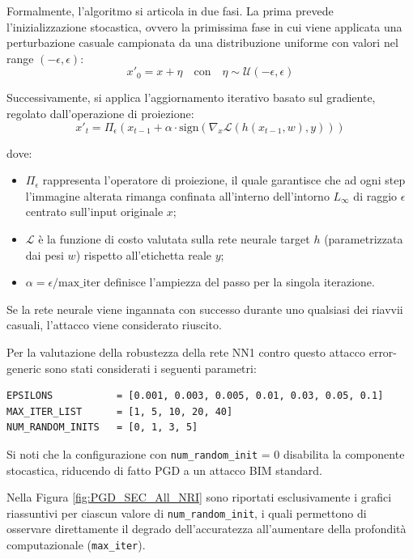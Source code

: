 \documentclass[a4paper, 12pt]{article}
\begin{document}
Formalmente, l'algoritmo si articola in due fasi. La prima prevede l'inizializzazione stocastica, ovvero la primissima fase in cui viene applicata una perturbazione casuale campionata da una distribuzione uniforme con valori nel range $(-\epsilon,\epsilon)$:
$$ x'_0 = x + \eta \quad \text{con} \quad \eta \sim \mathcal{U}(-\epsilon, \epsilon) $$

Successivamente, si applica l'aggiornamento iterativo basato sul gradiente, regolato dall'operazione di proiezione:
$$ x'_t = \Pi_\epsilon \left( x_{t-1} + \alpha \cdot \text{sign}(\nabla_x \mathcal{L}(h(x_{t-1}, w), y)) \right) $$

dove:
\begin{itemize}
    \item $\Pi_\epsilon$ rappresenta l'operatore di proiezione, il quale garantisce che ad ogni step l'immagine alterata rimanga confinata all'interno dell'intorno $L_\infty$ di raggio $\epsilon$ centrato sull'input originale $x$;
    \item $\mathcal{L}$ è la funzione di costo valutata sulla rete neurale target $h$ (parametrizzata dai pesi $w$) rispetto all'etichetta reale $y$;
    \item $\alpha = \epsilon / \text{max\_iter}$ definisce l'ampiezza del passo per la singola iterazione.
\end{itemize}

Se la rete neurale viene ingannata con successo durante uno qualsiasi dei riavvii casuali, l'attacco viene considerato riuscito.

Per la valutazione della robustezza della rete NN1 contro questo attacco error-generic sono stati considerati i seguenti parametri:
\begin{verbatim}
EPSILONS           = [0.001, 0.003, 0.005, 0.01, 0.03, 0.05, 0.1]
MAX_ITER_LIST      = [1, 5, 10, 20, 40]
NUM_RANDOM_INITS   = [0, 1, 3, 5]

\end{verbatim}

Si noti che la configurazione con \texttt{num\_random\_init} = 0 disabilita la componente stocastica, riducendo di fatto PGD a un attacco BIM standard.

Nella Figura \ref{fig:PGD_SEC_All_NRI} sono riportati esclusivamente i grafici riassuntivi per ciascun valore di \texttt{num\_random\_init}, i quali permettono di osservare direttamente il degrado dell'accuratezza all'aumentare della profondità computazionale (\texttt{max\_iter}).
\end{document}

